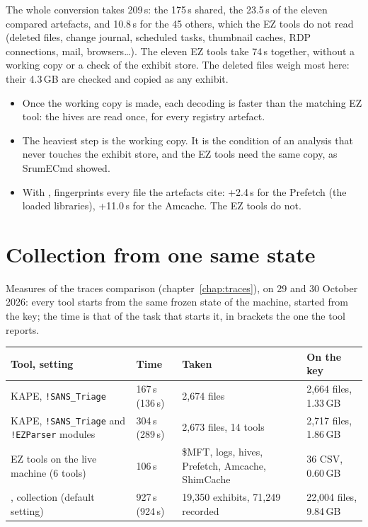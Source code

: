 \documentclass[11pt,a4paper,oneside]{report}
\begin{document}
The whole conversion takes 209\,s: the 175\,s shared, the 23.5\,s of the
eleven compared artefacts, and 10.8\,s for the 45 others, which the EZ tools
do not read (deleted files, change journal, scheduled tasks, thumbnail caches,
RDP connections, mail, browsers…). The eleven EZ tools take 74\,s together,
without a working copy or a check of the exhibit store. The deleted files
weigh most here: their 4.3\,GB are checked and copied as any exhibit.

\begin{itemize}
  \item Once the working copy is made, each \wac{} decoding is faster than the
        matching EZ tool: the hives are read once, for every registry artefact.
  \item The heaviest step is the working copy. It is the condition of an
        analysis that never touches the exhibit store, and the EZ tools need
        the same copy, as SrumECmd showed.
  \item With , \wac{} fingerprints every file the artefacts cite:
        +2.4\,s for the Prefetch (the loaded libraries), +11.0\,s for the
        Amcache. The EZ tools do not.
\end{itemize}

\section{Collection from one same state}

Measures of the traces comparison (chapter~\ref{chap:traces}), on 29 and 30
October 2026: every tool starts from the same frozen state of the machine,
started from the key; the time is that of the task that starts it, in
brackets the one the tool reports.

\begin{longtable}{@{}L{5.6cm}L{2.6cm}L{3.4cm}L{3.4cm}@{}}
\toprule
\textbf{Tool, setting} & \textbf{Time} & \textbf{Taken} & \textbf{On the key} \\
\midrule\endhead
KAPE, \texttt{!SANS\_Triage} & 167\,s (136\,s) & 2,674 files & 2,664 files, 1.33\,GB \\
KAPE, \texttt{!SANS\_Triage} and \texttt{!EZParser} modules & 304\,s (289\,s) & 2,673 files, 14 tools & 2,717 files, 1.86\,GB \\
EZ tools on the live machine (6 tools) & 106\,s & \$MFT, logs, hives, Prefetch, Amcache, ShimCache & 36 CSV, 0.60\,GB \\
\wac{}, collection (default setting) & 927\,s (924\,s) & 19,350 exhibits, 71,249 recorded & 22,004 files, 9.84\,GB \\
\bottomrule
\end{longtable}
\end{document}
